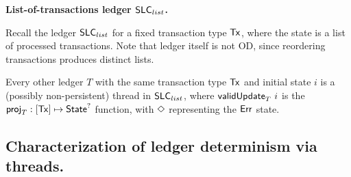 \textbf{List-of-transactions ledger $\mathsf{SLC}_{list}$.}

Recall the ledger $\mathsf{SLC}_{list}$ for a fixed transaction type $\mathsf{Tx}$, where the
state is a list of processed transactions. Note that ledger itself is not OD, since
reordering transactions produces distinct lists.

Every other ledger $T$ with the same transaction type $\mathsf{Tx}$ and initial state $i$ is a (possibly non-persistent)
thread in $\mathsf{SLC}_{list}$, where $\mathsf{validUpdate}_T~i$ is the $\mathsf{proj}_T : [\mathsf{Tx}] \mapsto \mathsf{State}^?$
function, with $\Diamond$ representing the $\mathsf{Err}$ state.

\subsection{Characterization of ledger determinism via threads.}

